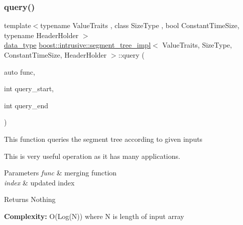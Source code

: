 \mbox{\label{classboost_1_1intrusive_1_1segment__tree__impl_ad0aa848ccb9520e36cf4dfbf9149b150}} 
\subsubsection{\texorpdfstring{query()}{query()}}
{\footnotesize\ttfamily template$<$typename Value\+Traits , class Size\+Type , bool Constant\+Time\+Size, typename Header\+Holder $>$ \\
\hyperlink{classboost_1_1intrusive_1_1segment__tree__impl_a92c83c631da1bcdaa004756ea98b2ec5}{data\+\_\+type} \hyperlink{classboost_1_1intrusive_1_1segment__tree__impl}{boost\+::intrusive\+::segment\+\_\+tree\+\_\+impl}$<$ Value\+Traits, Size\+Type, Constant\+Time\+Size, Header\+Holder $>$\+::query (\begin{DoxyParamCaption}\item[{auto}]{func,  }\item[{int}]{query\+\_\+start,  }\item[{int}]{query\+\_\+end }\end{DoxyParamCaption})\hspace{0.3cm}{\ttfamily [inline]}}


\begin{DoxyItemize}
\item This function queries the segment tree according to given inputs  
\item This is very useful operation as it has many applications.  
\end{DoxyItemize}
\begin{DoxyParams}{Parameters}
{\em func} & merging function \\
\hline
{\em index} & updated index \\
\hline
\end{DoxyParams}
\begin{DoxyReturn}{Returns}
Nothing 
\end{DoxyReturn}


{\bfseries  Complexity\+: } O(\+Log(\+N)) where N is length of input array \mbox{\label{classboost_1_1intrusive_1_1segment__tree__impl_a527965bd8a82b220f6a46c65fb97c335}} 
